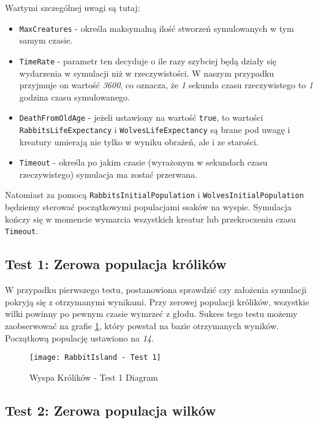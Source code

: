 Wartymi szczególnej uwagi są tutaj:
\begin{itemize}
	\item \texttt{MaxCreatures} - określa maksymalną ilość stworzeń symulowanych w tym samym czasie.
	\item \texttt{TimeRate} - parametr ten decyduje o ile razy szybciej będą działy się wydarzenia w symulacji niż w rzeczywistości. W naszym przypadku przyjmuje on wartość \emph{3600}, co oznacza, że \emph{1} sekunda czasu rzeczywistego to \emph{1} godzina czasu symulowanego.
	\item \texttt{DeathFromOldAge} - jeżeli ustawiony na wartość \texttt{true}, to wartości \texttt{RabbitsLifeExpectancy} i \texttt{WolvesLifeExpectancy} są brane pod uwagę i kreatury umierają nie tylko w wyniku obrażeń, ale i ze starości.
	\item \texttt{Timeout} - określa po jakim czasie (wyrażonym w sekundach czasu rzeczywistego) symulacja ma zostać przerwana.
\end{itemize}

Natomiast za pomocą \texttt{RabbitsInitialPopulation} i \texttt{WolvesInitialPopulation} będziemy sterować początkowymi populacjami ssaków na wyspie. Symulacja kończy się w momencie wymarcia wszystkich kreatur lub przekroczeniu czasu \texttt{Timeout}.

\subsection{Test 1: Zerowa populacja królików}

\par W przypadku pierwszego testu, postanowiona sprawdzić czy założenia symulacji pokryją się z otrzymanymi wynikami. Przy zerowej populacji królików, wszystkie wilki powinny po pewnym czasie wymrzeć z głodu. Sukces tego testu możemy zaobserwować na grafie \ref{fig:rabbitIslandTest1Diagram1}, który powstał na bazie otrzymanych wyników. Początkową populację ustawiono na \emph{14}.

\begin{figure}
	\texttt{[image: RabbitIsland - Test 1]}
	\caption{Wyspa Królików - Test 1 Diagram}
	\label{fig:rabbitIslandTest1Diagram1}
\end{figure}

\subsection{Test 2: Zerowa populacja wilków}

